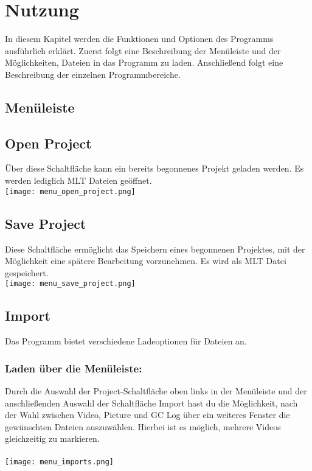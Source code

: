 \chapter{Nutzung}
In diesem Kapitel werden die Funktionen und Optionen des Programms ausführlich erklärt. 
Zuerst folgt eine Beschreibung der Menüleiste und der Möglichkeiten, Dateien in das Programm zu laden. Anschließend folgt eine Beschreibung der einzelnen Programmbereiche.
\\
\section*{Menüleiste}

\section{Open Project}
Über diese Schaltfläche kann ein bereits begonnenes Projekt geladen werden. Es werden lediglich MLT Dateien geöffnet.\\
\texttt{[image: menu\_open\_project.png]}

\section{Save Project}
Diese Schaltfläche ermöglicht das Speichern eines begonnenen Projektes, mit der Möglichkeit eine spätere Bearbeitung vorzunehmen. Es wird als MLT Datei gespeichert.\\
\texttt{[image: menu\_save\_project.png]}
 
\section{Import}
Das Programm bietet verschiedene Ladeoptionen für Dateien an. \\
\subsection{Laden über die Menüleiste:}
Durch die Auswahl der Project-Schaltfläche oben links in der Menüleiste und der anschließenden Auswahl der Schaltfläche Import hast du die Möglichkeit, nach der Wahl zwischen Video, Picture und GC Log über ein weiteres Fenster die gewünschten Dateien auszuwählen. Hierbei ist es möglich, mehrere Videos gleichzeitig zu markieren. 
\\
\vspace{5mm}
\\
\texttt{[image: menu\_imports.png]}\\

